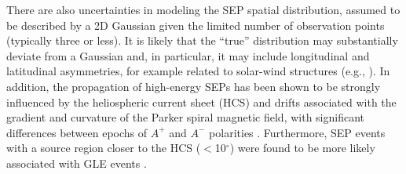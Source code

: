 \documentclass{aastex61}
\begin{document}
There are also uncertainties in modeling the SEP spatial distribution,
assumed to be described by a 2D Gaussian given the limited number of observation points (typically three or less). It is likely that the ``true'' distribution may substantially deviate from a Gaussian and, in particular, it may include longitudinal and latitudinal asymmetries, for example related to solar-wind structures (e.g., \citealp{ref:LARIO2022}). In addition, the propagation of high-energy SEPs has been shown to be strongly influenced by the heliospheric current sheet (HCS) and drifts associated with the gradient and curvature of the Parker spiral magnetic field, with significant differences between epochs of $A^{+}$ and $A^{-}$ polarities \citep{ref:DALLA2020}. Furthermore, SEP events with a source region closer
to the HCS ($<$10$^{\circ}$) were found to be more likely associated with GLE events \citep{ref:WATERFALL2022}.
\end{document}
